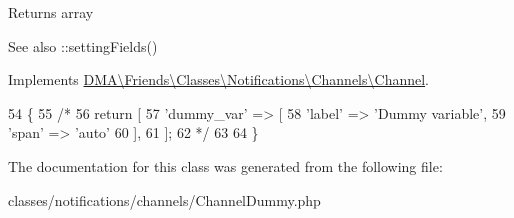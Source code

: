 \begin{DoxyReturn}{Returns}
array
\end{DoxyReturn}
 \begin{DoxySeeAlso}{See also}
\+::setting\+Fields() 
\end{DoxySeeAlso}


Implements \hyperlink{interfaceDMA_1_1Friends_1_1Classes_1_1Notifications_1_1Channels_1_1Channel_aa473115fa58a6fa5f57a9069f23dd771}{D\+M\+A\textbackslash{}\+Friends\textbackslash{}\+Classes\textbackslash{}\+Notifications\textbackslash{}\+Channels\textbackslash{}\+Channel}.


\begin{DoxyCode}
54     \{
55         \textcolor{comment}{/*}
56 \textcolor{comment}{        return [}
57 \textcolor{comment}{            'dummy\_var' => [}
58 \textcolor{comment}{                'label' => 'Dummy variable',}
59 \textcolor{comment}{                'span'  => 'auto'}
60 \textcolor{comment}{            ],}
61 \textcolor{comment}{        ];}
62 \textcolor{comment}{        */}
63 
64     \}
\end{DoxyCode}


The documentation for this class was generated from the following file\+:\begin{DoxyCompactItemize}
\item 
classes/notifications/channels/Channel\+Dummy.\+php\end{DoxyCompactItemize}
